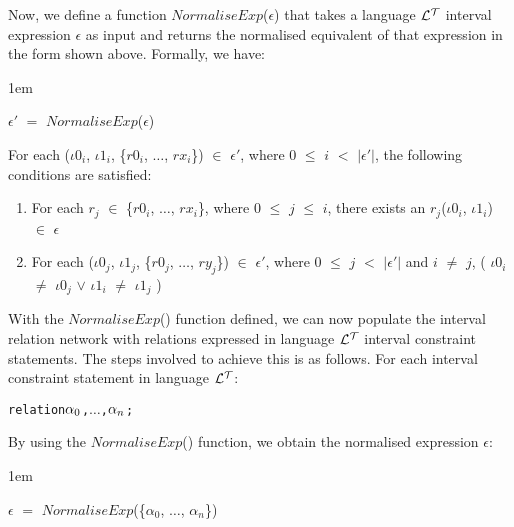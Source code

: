\documentclass[11pt]{report}
\newenvironment{vverbatim}
{
  \begin{alltt}
}
{
    \vspace{-\baselineskip}
  \end{alltt}
}
\newenvironment{vquote}
{
  \begin{list}{}{\leftmargin 1em}\item[]
}
{
  \end{list}
}
\begin{document}
            Now, we define a function $NormaliseExp$($\epsilon$) that takes
            a language ${\cal L^T}$ interval expression $\epsilon$ as
            input and returns the normalised equivalent of that expression in
            the form shown above. Formally, we have:

            \begin{vquote}
              ${\epsilon}'$ $=$ $NormaliseExp$($\epsilon$)
            \end{vquote}

            \noindent
            For each
            (${\iota}0_i$, ${\iota}1_i$, \{$r0_i$, $\ldots$, $rx_i$\})
            $\in$ ${\epsilon}'$,
            where $0$ $\leq$ $i$ $<$ $|{\epsilon}'|$, the following
            conditions are satisfied:

            \begin{enumerate}
              \item
                For each $r_j$ $\in$ \{$r0_i$, $\ldots$, $rx_i$\}, where $0$
                $\leq$ $j$ $\leq$ $i$, there exists an
                $r_j$(${\iota}0_i$, ${\iota}1_i$) $\in$ $\epsilon$

              \item
                For each
                (${\iota}0_j$, ${\iota}1_j$, \{$r0_j$, $\ldots$, $ry_j$\})
                $\in$ ${\epsilon}'$, where $0$ $\leq$ $j$ $<$
                $|{\epsilon}'|$ and $i$ $\neq$ $j$,
                (
                  ${\iota}0_i$ $\neq$ ${\iota}0_j$ $\lor$
                  ${\iota}1_i$ $\neq$ ${\iota}1_j$
                )
            \end{enumerate}

            With the $NormaliseExp$() function defined, we can now populate the
            interval relation network with relations expressed in language
            ${\cal L^T}$ interval constraint statements. The steps involved
            to achieve this is as follows. For each interval constraint
            statement in language ${\cal L^T}$:

            \begin{vverbatim}
  relation \(\alpha\sb{0}\), \(\ldots\), \(\alpha\sb{n}\);
            \end{vverbatim}

            \noindent
            By using the $NormaliseExp$() function, we obtain the normalised
            expression $\epsilon$:

            \begin{vquote}
              $\epsilon$ $=$
                $NormaliseExp$(\{${\alpha}_0$, $\ldots$, ${\alpha}_n$\})
            \end{vquote}
\end{document}
